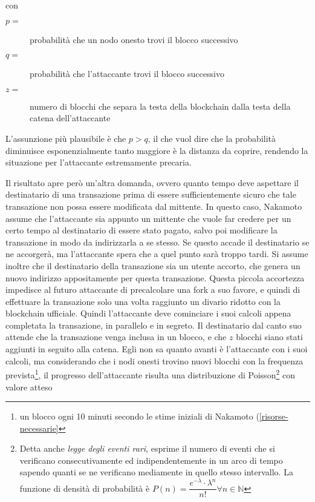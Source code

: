 con

\begin{description}
\item[$p = $] probabilità che un nodo onesto trovi il blocco successivo
\item[$q = $] probabilità che l'attaccante trovi il blocco successivo
\item[$z = $] numero di blocchi che separa la testa della blockchain dalla testa della catena dell'attaccante
\end{description}

L'assunzione più plausibile è che $p > q$, il che vuol dire che la probabilità diminuisce esponenzialmente tanto maggiore è la distanza da coprire, rendendo la situazione per l'attaccante estremamente precaria.

Il risultato apre però un'altra domanda, ovvero quanto tempo deve aspettare il destinatario di una transazione prima di essere sufficientemente sicuro che tale transazione non possa essere modificata dal mittente.
In questo caso, Nakamoto assume che l'attaccante sia appunto un mittente che vuole far credere per un certo tempo al destinatario di essere stato pagato, salvo poi modificare la transazione in modo da indirizzarla a se stesso. Se questo accade il destinatario se ne accorgerà, ma l'attaccante spera che a quel punto sarà troppo tardi.
Si assume inoltre che il destinatario della transazione sia un utente accorto, che genera un nuovo indirizzo appositamente per questa transazione. Questa piccola accortezza impedisce al futuro attaccante di precalcolare una fork a suo favore, e quindi di effettuare la transazione solo una volta raggiunto un divario ridotto con la blockchain ufficiale. Quindi l'attaccante deve cominciare i suoi calcoli appena completata la transazione, in parallelo e in segreto.
Il destinatario dal canto suo attende che la transazione venga inclusa in un blocco, e che $z$ blocchi siano stati aggiunti in seguito alla catena. Egli non sa quanto avanti è l'attaccante con i suoi calcoli, ma considerando che i nodi onesti trovino nuovi blocchi con la frequenza prevista\footnote{un blocco ogni 10 minuti secondo le stime iniziali di Nakamoto (\ref{risorse-necessarie}}, il progresso dell'attaccante risulta una distribuzione di Poisson\footnote{Detta anche \emph{legge degli eventi rari}, esprime il numero di eventi che si verificano consecutivamente ed indipendentemente in un arco di tempo sapendo quanti se ne verificano mediamente in quello stesso intervallo. La funzione di densità di probabilità è $P(n) = \dfrac{e^{-\lambda} \cdot \lambda^n}{n!} \forall n \in \mathbb{N}$} con valore atteso

